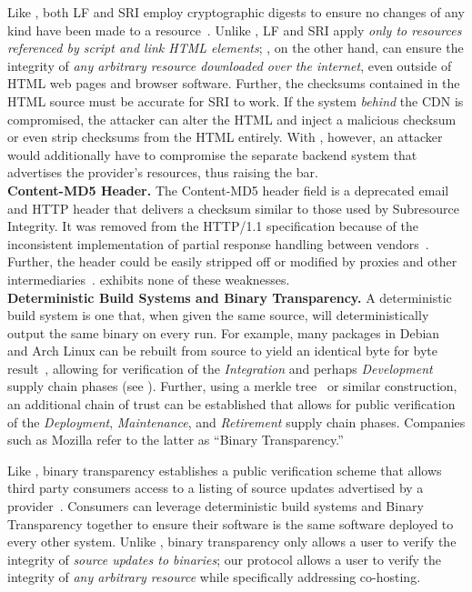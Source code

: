 Like \SYSTEM{}, both LF and SRI employ cryptographic digests to ensure no
changes of any kind have been made to a resource~\cite{SRI}. Unlike \SYSTEM{},
LF and SRI apply \emph{only to resources referenced by script and link HTML
elements}; \SYSTEM{}, on the other hand, can ensure the integrity of \emph{any
arbitrary resource downloaded over the internet}, even outside of HTML web pages
and browser software. Further, the checksums contained in the HTML source must
be accurate for SRI to work. If the system \emph{behind} the CDN is compromised,
the attacker can alter the HTML and inject a malicious checksum or even strip
checksums from the HTML entirely. With \SYSTEM{}, however, an attacker would
additionally have to compromise the separate backend system that advertises the
provider's resources, thus raising the bar. \\

\noindent\textbf{Content-MD5 Header.} The Content-MD5 header field is a
deprecated email and HTTP header that delivers a checksum similar to those used
by Subresource Integrity. It was removed from the HTTP/1.1 specification because
of the inconsistent implementation of partial response handling between
vendors~\cite{HTTP1.1}. Further, the header could be easily stripped off or
modified by proxies and other intermediaries~\cite{MD5Header}. \SYSTEM{}
exhibits none of these weaknesses. \\

\noindent\textbf{Deterministic Build Systems and Binary Transparency.} A
deterministic build system is one that, when given the same source, will
deterministically output the same binary on every run. For example, many
packages in Debian~\cite{ReproBuildsDebian} and Arch Linux can be rebuilt from
source to yield an identical byte for byte result~\cite{ReproBuilds}, allowing
for verification of the \emph{Integration} and perhaps \emph{Development} supply
chain phases (see ). Further, using a merkle
tree~\cite{MerkleTree} or similar construction, an additional chain of trust can
be established that allows for public verification of the \emph{Deployment},
\emph{Maintenance}, and \emph{Retirement} supply chain phases. Companies such as
Mozilla refer to the latter as ``Binary Transparency.''

Like \SYSTEM{}, binary transparency establishes a public verification scheme
that allows third party consumers access to a listing of source updates
advertised by a provider~\cite{BinaryTransparency}. Consumers can leverage
deterministic build systems and Binary Transparency together to ensure their
software is the same software deployed to every other system. Unlike \SYSTEM{},
binary transparency only allows a user to verify the integrity of \emph{source
updates to binaries}; our protocol allows a user to verify the integrity of
\emph{any arbitrary resource} while specifically addressing co-hosting. \\

